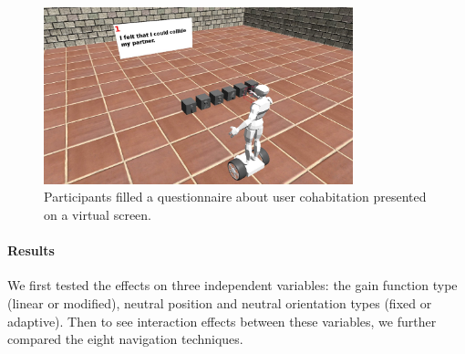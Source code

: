 \begin{figure}[tb]
  \centering
  \includegraphics[width=0.8\textwidth]{figures/ch3/t3_q}
  \caption{\label{fig:3_task3_q}Participants filled a questionnaire about user cohabitation presented on a virtual screen.}
\end{figure}


\paragraph{Results}
We first tested the effects on three independent variables: the gain function type (linear or modified), neutral position and neutral orientation types (fixed or adaptive). Then to see interaction effects between these variables, we further compared the eight navigation techniques.

